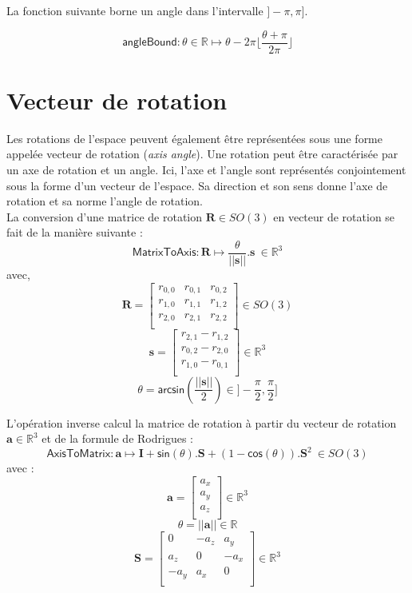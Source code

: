 La fonction suivante borne un angle dans l'intervalle 
$]-\pi,\pi]$.

$$
\mathsf{angleBound} : \theta \in \mathbb{R} 
\longmapsto \theta - 2\pi\lfloor\frac{\theta + \pi}{2\pi}\rfloor 
$$

\section{Vecteur de rotation\label{sec:axis_angle}}

Les rotations de l'espace peuvent également être représentées
sous une forme appelée \og vecteur de rotation \fg (\textit{axis angle}).
Une rotation peut être caractérisée par un axe de rotation et un angle.
Ici, l'axe et l'angle sont représentés conjointement sous 
la forme d'un vecteur de l'espace. 
Sa direction et son sens donne l'axe de rotation 
et sa norme l'angle de rotation.\\

La conversion d'une matrice de rotation $\bm{R} \in SO(3)$ 
en vecteur de rotation se fait de la manière suivante :
$$
\mathsf{MatrixToAxis} : \bm{R} \longmapsto
\frac{\theta}{||\bm{s}||}.\bm{s} ~\in \mathbb{R}^{3}
$$
avec,
$$
\bm{R} = 
\begin{bmatrix}
r_{0,0} & r_{0,1} & r_{0,2} \\
r_{1,0} & r_{1,1} & r_{1,2} \\
r_{2,0} & r_{2,1} & r_{2,2} \\
\end{bmatrix}
\in SO(3)
$$
$$
\bm{s} = 
\begin{bmatrix}
    r_{2,1} - r_{1,2} \\
    r_{0,2} - r_{2,0} \\
    r_{1,0} - r_{0,1} \\
\end{bmatrix}
\in \mathbb{R}^3
$$
$$
\theta = \mathsf{arcsin}\left(\frac{||\bm{s}||}{2}\right)
\in ]-\frac{\pi}{2},\frac{\pi}{2}]
$$
\newline

L'opération inverse calcul la matrice de rotation à
partir du vecteur de rotation $\bm{a} \in \mathbb{R}^3$ et de la formule de Rodrigues :
$$
\mathsf{AxisToMatrix} : \bm{a} \longmapsto 
\bm{I} + \mathsf{sin}(\theta).\bm{S} + (1-\mathsf{cos}(\theta)).\bm{S}^2 
~\in SO(3)
$$
avec :
$$
\bm{a} = \begin{bmatrix}
    a_x \\
    a_y \\
    a_z \\
\end{bmatrix}
\in \mathbb{R}^3
$$
$$
\theta = ||\bm{a}|| \in \mathbb{R}
$$
$$
\bm{S} = 
\begin{bmatrix}
    0 & -a_z & a_y \\
    a_z & 0 & -a_x \\
    -a_y & a_x & 0 \\
\end{bmatrix}
\in \mathbb{R}^3
$$
\newline

